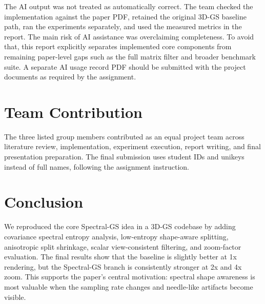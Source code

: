 \documentclass{article}
\begin{document}
The AI output was not treated as automatically correct. The team checked the implementation against the paper PDF, retained the original 3D-GS baseline path, ran the experiments separately, and used the measured metrics in the report. The main risk of AI assistance was overclaiming completeness. To avoid that, this report explicitly separates implemented core components from remaining paper-level gaps such as the full matrix filter and broader benchmark suite. A separate AI usage record PDF should be submitted with the project documents as required by the assignment.

\section{Team Contribution}
\label{sec:contribution}

The three listed group members contributed as an equal project team across literature review, implementation, experiment execution, report writing, and final presentation preparation. The final submission uses student IDs and unikeys instead of full names, following the assignment instruction.

\section{Conclusion}
\label{sec:conclusion}

We reproduced the core Spectral-GS idea in a 3D-GS codebase by adding covariance spectral entropy analysis, low-entropy shape-aware splitting, anisotropic split shrinkage, scalar view-consistent filtering, and zoom-factor evaluation. The final results show that the baseline is slightly better at 1x rendering, but the Spectral-GS branch is consistently stronger at 2x and 4x zoom. This supports the paper's central motivation: spectral shape awareness is most valuable when the sampling rate changes and needle-like artifacts become visible.



\end{document}

